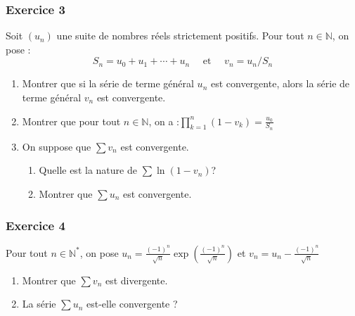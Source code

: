 \documentclass{article}
\begin{document}
\subsubsection*{Exercice 3}
Soit $(u_n)$ une suite de nombres réels strictement positifs. Pour tout $n\in\mathbb{N}$, on pose : 
\[S_n=u_0+u_1+\cdots+u_n\quad \mbox{ et }\quad v_n=u_n/S_n\]
\begin{enumerate}
\item    Montrer que si la série de terme général $u_n$ est convergente, alors la série de terme général $v_n$ est convergente.
\item    Montrer que pour tout $n\in\mathbb{N}$, on a :$\prod_{k=1}^n(1-v_k)=\frac{u_0}{S_n}$
\item    On suppose que $\sum v_n$ est convergente.
\begin{enumerate}
\item     Quelle est la nature de $\sum\ln(1-v_n)$?
\item   Montrer que $\sum u_n$ est convergente.
\end{enumerate}
\end{enumerate}

\subsubsection*{Exercice 4}
Pour tout $n\in\mathbb{N}^*$, on pose $u_n=\frac{(-1)^n}{\sqrt n}\exp\left(\frac{(-1)^n}{\sqrt n}\right)$ et $v_n=u_n-\frac{(-1)^n}{\sqrt n}$ 
\begin{enumerate}
\item      Montrer que $\sum v_n$ est divergente.
\item  La série $\sum u_n$ est-elle convergente ?
\end{enumerate}
\end{document}
